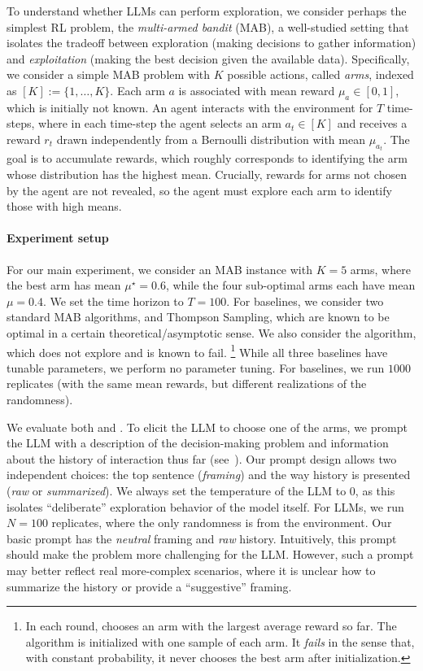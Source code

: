 To understand whether LLMs can perform exploration, we consider perhaps the simplest RL problem, the \emph{multi-armed bandit} (MAB),
a well-studied setting that isolates the tradeoff between exploration (making decisions to gather information) and \emph{exploitation} (making the best decision given the available data).
Specifically, we consider a simple MAB problem with
$K$ possible actions, called \emph{arms}, indexed as $[K]:=\{1,\ldots,K\}$. Each arm $a$ is associated with mean reward $\mu_a\in[0,1]$, which is initially not known.
An agent interacts with the environment for $T$ time-steps, where in each time-step the agent selects an arm $a_t \in [K]$ and receives a reward $r_t$ drawn independently from a Bernoulli distribution with mean $\mu_{a_t}$.
The goal is to accumulate rewards, which roughly corresponds to identifying the arm whose distribution has the highest mean. Crucially, rewards for arms not chosen by the agent are
not revealed, so the agent must explore each arm to identify those
with high means.

\paragraph{Experiment setup}
For our main experiment, we consider an MAB instance with $K=5$ arms,
where the best arm has mean $\mu^\star = 0.6$, while the four sub-optimal arms each have mean $\mu = 0.4$. We set the time horizon to $T=100$. For baselines, we consider two standard MAB algorithms, \ucb and Thompson Sampling, which are known to be optimal in a certain theoretical/asymptotic sense. We also consider the \greedy algorithm, which does not explore and is known to fail.%
\footnote{In each round, \greedy chooses an arm with the largest average reward so far. The algorithm is initialized with one sample of each arm. It \emph{fails} in the sense that, with constant probability, it never chooses the best arm after initialization.}
While all three baselines have tunable parameters,
we perform no parameter tuning.  For baselines, we run $1000$ replicates (with the same mean rewards, but different realizations of the randomness).

We evaluate both \gptthree and \gptfour. To elicit the LLM to choose
one of the arms, we prompt the LLM with a description of the
decision-making problem and information about the history of
interaction thus far (see~). Our prompt design allows two independent choices: the top sentence (\emph{framing}) and the way history is presented (\emph{raw} or \emph{summarized}). We always set the
temperature of the LLM to $0$, as this isolates ``deliberate''
exploration behavior of the model itself. For LLMs, we run $N=100$
replicates, where the only randomness is from the environment. Our basic prompt has the \emph{neutral} framing and \emph{raw} history. Intuitively, this prompt should make the problem more challenging for the LLM. However, such a prompt may better reflect real more-complex scenarios, where it is unclear how to summarize the history or provide a ``suggestive'' framing.


